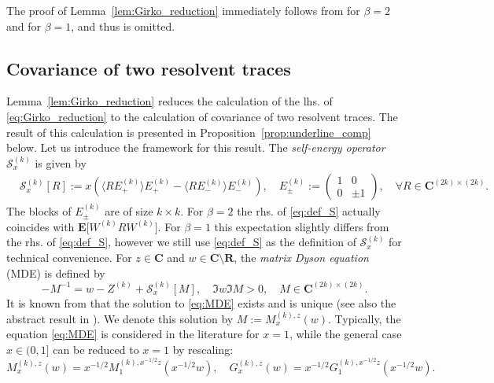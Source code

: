 \documentclass[10pt]{amsart}
\numberwithin{equation}{section}
\newcommand{\E}{\mathbf{E}}
\newcommand{\R}{\mathbf{R}}
\newcommand{\C}{\mathbf{C}}
\begin{document}
The proof of Lemma~\ref{lem:Girko_reduction} immediately follows from \cite[Lemma~4.1]{macroCLT_complex} for $\beta=2$ and \cite[Proposition~3.4]{macroCLT_real} for $\beta=1$, and thus is omitted. 


\subsection{Covariance of two resolvent traces}\label{sec:strategy_Cov} Lemma~\ref{lem:Girko_reduction} reduces the calculation of the lhs. of \eqref{eq:Girko_reduction} to the calculation of covariance of two resolvent traces. The result of this calculation is presented in Proposition~\ref{prop:underline_comp} below. Let us introduce the framework for this result. The \emph{self-energy operator} $\mathcal{S}^{(k)}_x$ is given by
\begin{equation}
\begin{split}
&\mathcal{S}^{(k)}_x[R] := x\left(\big\langle RE_+^{(k)}\big\rangle E_+^{(k)} -\big\langle RE_-^{(k)}\big\rangle E_-^{(k)}\right),\quad E_\pm^{(k)}:=\begin{pmatrix}
1&0\\0&\pm 1
\end{pmatrix},\quad \forall R\in \C^{(2k)\times (2k)}.
\end{split}
\label{eq:def_S}
\end{equation}
The blocks of $E^{(k)}_\pm$ are of size $k\times k$. For $\beta=2$ the rhs. of \eqref{eq:def_S} actually coincides with $\E\big[ W^{(k)}RW^{(k)}\big]$. For $\beta=1$ this expectation slightly differs from the rhs. of \eqref{eq:def_S}, however we still use \eqref{eq:def_S} as the definition of $\mathcal{S}_x^{(k)}$ for technical convenience. For $z\in\C$ and $w\in\C\setminus\R$, the \emph{matrix Dyson equation} (MDE) is defined by
\begin{equation}
-M^{-1}=w-Z^{(k)}+\mathcal{S}^{(k)}_x[M],\quad \Im w\Im M>0,\quad M\in\C^{(2k)\times (2k)}.
\label{eq:MDE}
\end{equation}
It is known from \cite[Lemma~2.2]{loc_circ_law18} that the solution to \eqref{eq:MDE} exists and is unique (see also the abstract result in \cite{Helton07}). We denote this solution by $M:=M^{(k),z}_x(w)$. Typically, the equation \eqref{eq:MDE} is considered in the literature for $x=1$, while the general case $x\in (0,1]$ can be reduced to $x=1$ by rescaling:
\begin{equation}
M_x^{(k),z}(w) =x^{-1/2} M_1^{(k),x^{-1/2}z}\left(x^{-1/2}w\right),\quad G_x^{(k),z}(w) =x^{-1/2} G_1^{(k),x^{-1/2}z}\left(x^{-1/2}w\right).
\label{eq:M_rescaling}
\end{equation}
\end{document}
